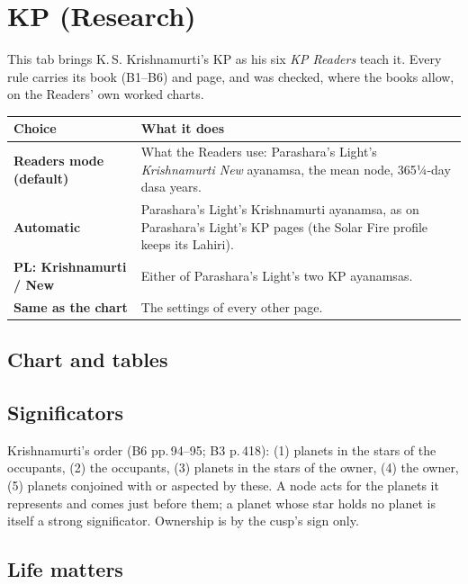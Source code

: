 \documentclass[11pt, a4paper]{article}
\newcommand{\shot}[1]{}
\newcommand{\PL}{Parashara's Light}
\begin{document}
\section{KP (Research)}
\label{sec:kp}
This tab brings K.\,S. Krishnamurti's KP as his six \emph{KP Readers} teach it. Every rule carries its
book (B1--B6) and page, and was checked, where the books allow, on the Readers' own worked charts.

\shot{kpcalc}

\begin{tabularx}{\linewidth}{>{\bfseries}l X}
\toprule
Choice & What it does \\
\midrule
Readers mode (default) & What the Readers use: \PL{}'s \emph{Krishnamurti New} ayanamsa, the mean node, 365¼-day dasa years. \\
Automatic & \PL{}'s Krishnamurti ayanamsa, as on \PL{}'s KP pages (the Solar Fire profile keeps its Lahiri). \\
PL: Krishnamurti / New & Either of \PL{}'s two KP ayanamsas. \\
Same as the chart & The settings of every other page. \\
\bottomrule
\end{tabularx}

\subsection{Chart and tables}
\shot{kpchart}
\shot{kpcusps}
\shot{kpsig}

\subsection{Significators}
\shot{kprank}

Krishnamurti's order (B6 pp.\,94--95; B3 p.\,418): (1) planets in the stars of the occupants, (2) the
occupants, (3) planets in the stars of the owner, (4) the owner, (5) planets conjoined with or aspected
by these. A node acts for the planets it represents and comes just before them; a planet whose star holds
no planet is itself a strong significator. Ownership is by the cusp's sign only.

\shot{kppsets}

\subsection{Life matters}
\shot{kppromise}
\end{document}
